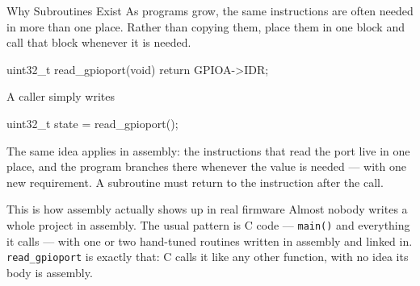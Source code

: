 \documentclass[9pt,aspectratio=169,xcolor=table]{beamer}
\begin{document}
\begin{frame}[fragile]{Why Subroutines Exist}
	\leavevmode
	{\small As programs grow, the same instructions are often needed in more
	than one place. Rather than copying them, place them in one block and
	\alert{call} that block whenever it is needed.}

	\vspace{1mm}
	\begin{cc}
uint32_t read_gpioport(void) {
    return GPIOA->IDR;
}
	\end{cc}

	\vspace{2mm}
	{\small A caller simply writes}
	\begin{cc}
uint32_t state = read_gpioport();
	\end{cc}

	\vspace{0mm}
	{\small The same idea applies in assembly: the instructions that read the
	port live in one place, and the program branches there whenever the
	value is needed --- with one new requirement. A subroutine must
	\alert{return to the instruction after the call}.}

	\vspace{1mm}
	\begin{block}{This is how assembly actually shows up in real firmware}
		Almost nobody writes a whole project in assembly. The usual pattern
		is \alert{C code --- \texttt{main()} and everything it calls ---
		with one or two hand-tuned routines written in assembly and linked
		in}. \texttt{read\_gpioport} is exactly that: C calls it like any
		other function, with no idea its body is assembly.
	\end{block}
\end{frame}
\end{document}
